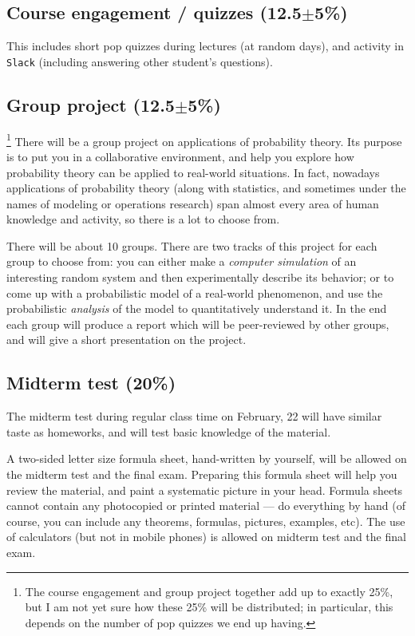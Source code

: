 \documentclass[oneside,11pt]{amsart}
\begin{document}
\subsection{Course engagement / quizzes (12.5$\pm$5\%)}

This includes short pop quizzes during lectures (at random days), 
and activity in \texttt{Slack} (including answering other student's questions).

\subsection{Group project (12.5$\pm$5\%)}\footnote{%
	The course engagement and group project together add up to exactly 25\%, but 
	I am not yet sure how these 25\% will be distributed; in particular, this 
	depends on the number of pop quizzes we end up having.
}\label{group_project}%
There will be a group project on applications of probability theory.
Its purpose is to put you in a collaborative environment,
and help you explore how probability theory can be applied
to real-world situations.
In fact, nowadays applications of probability theory (along with statistics,
and sometimes under the names of modeling or operations research)
span almost every area of human knowledge and activity, so there is a lot to choose from.

There will be about 10 groups. There are two tracks of this project
for each group to choose from:
you can either make a \emph{computer simulation} of an interesting random 
system and then experimentally describe its behavior;
or to come up with a probabilistic model of a real-world phenomenon, and 
use the probabilistic \emph{analysis} of the model to quantitatively understand it.
In the end each group will produce a report which will be peer-reviewed by other 
groups, and will give a short presentation on the
project.

\subsection{Midterm test (20\%)}

The midterm test during regular class time
on February, 22 will have similar taste as homeworks, and will test basic knowledge of the material.

A two-sided letter size formula sheet, hand-written by yourself, will be
allowed on the midterm test and the final exam. Preparing this formula sheet
will help you review the material, and paint a systematic picture in your head.
Formula sheets cannot contain any photocopied or printed material
--- do everything by hand (of course, you can include any theorems, formulas, pictures, 
examples, etc).
The use of calculators (but not in mobile phones)
is allowed on midterm test and the final exam.
\end{document}
